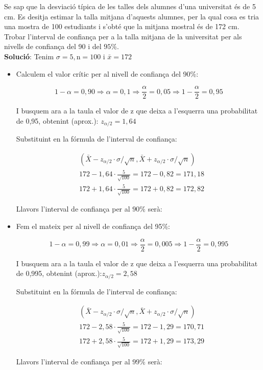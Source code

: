\documentclass[12pt]{article}
\begin{document}
\begin{exemple} [title=Exemple 1:] \noindent
Se sap que la desviació típica de les talles dels alumnes d'una universitat és de 5 cm. Es desitja estimar la talla mitjana d'aquests alumnes, per la qual cosa es tria una mostra de 100 estudiants i s'obté que la mitjana mostral és de 172 cm. \\

Trobar l'interval de confiança per a la talla mitjana de la universitat per als nivells de confiança del 90 i del $95 \%$.\\

\textbf{Solució}:
Tenim $\sigma=5, \mathrm{n}=100$ i $\bar{x}=172$

\begin{itemize}
    \item Calculem el valor crític per al nivell de confiança del 90\%:


$$
1-\alpha=0,90 \Rightarrow \alpha=0,1 \Rightarrow \frac{\alpha}{2}=0,05 \Rightarrow 1-\frac{\alpha}{2}=0,95
$$

I busquem ara a la taula el valor de z que deixa a l'esquerra una probabilitat de 0,95, obtenint (aprox.):  $z_{\alpha / 2}=1,64$


Substituint en la fórmula de l'interval de confiança:

$$
\begin{aligned}
& \left(\bar{X}-z_{\alpha / 2} \cdot \sigma / \sqrt{n}, \bar{X}+z_{\alpha / 2} \cdot \sigma / \sqrt{n}\right) \\
& 172-1,64 \cdot \frac{5}{\sqrt{100}}=172-0,82=171,18 \\
& 172+1,64 \cdot \frac{5}{\sqrt{100}}=172+0,82=172,82
\end{aligned}
$$

Llavors l'interval de confiança per al $90 \%$ serà: \\

\item Fem el mateix per al nivell de confiança del 95\%:

$$
1-\alpha=0,99 \Rightarrow \alpha=0,01 \Rightarrow \frac{\alpha}{2}=0,005 \Rightarrow 1-\frac{\alpha}{2}=0,995
$$

I busquem ara a la taula el valor de z que deixa a l'esquerra una probabilitat de 0,995, obtenint (aprox.):$z_{\alpha / 2}=2,58$


Substituint en la fórmula de l'interval de confiança:

$$
\begin{aligned}
& \left(\bar{X}-z_{\alpha / 2} \cdot \sigma / \sqrt{n}, \bar{X}+z_{\alpha / 2} \cdot \sigma / \sqrt{n}\right) \\
& 172-2,58 \cdot \frac{5}{\sqrt{100}}=172-1,29=170,71 \\
& 172+2,58 \cdot \frac{5}{\sqrt{100}}=172+1,29=173,29
\end{aligned}
$$


Llavors l'interval de confiança per al $99 \%$ serà: 
\end{itemize}

\end{exemple}
\end{document}

